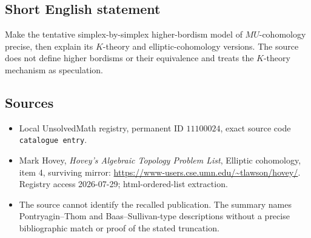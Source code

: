 \documentclass[11pt]{article}
\begin{document}
\subsection{Short English statement}
Make the tentative simplex-by-simplex higher-bordism model of \(MU\)-cohomology precise, then explain its \(K\)-theory and elliptic-cohomology versions. The source does not define higher bordisms or their equivalence and treats the \(K\)-theory mechanism as speculation.
\subsection{Sources}
\begin{itemize}
\item Local UnsolvedMath registry, permanent ID \(11100024\), exact source code \texttt{catalogue entry}.
\item Mark Hovey, \emph{Hovey's Algebraic Topology Problem List}, Elliptic cohomology, item 4, surviving mirror: \url{https://www-users.cse.umn.edu/~tlawson/hovey/}. Registry access 2026-07-29; html-ordered-list extraction.
\item The source cannot identify the recalled publication. The summary names Pontryagin--Thom and Baas--Sullivan-type descriptions without a precise bibliographic match or proof of the stated truncation.
\end{itemize}
\end{document}
